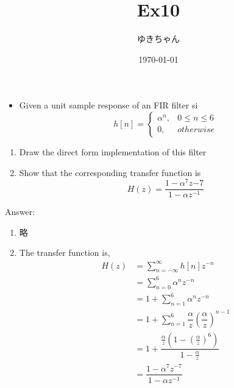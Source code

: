 \documentclass[a4paper,16pt]{jsarticle}
\title{Ex10}
\author{ゆきちゃん}
\date{\today}
\begin{document}
\maketitle

\begin{itemize}
	\item Given a unit sample response of an FIR filter si
	\begin{equation}
		h[n] =
		\begin{cases}
			\alpha^n, & 0 \leq n \leq 6 \\
			0,        & otherwise
		\end{cases}
	\end{equation}
\end{itemize}

\begin{enumerate}
	\item Draw the direct form implementation of this filter
	\item Show that the corresponding transfer function is
	\begin{equation}
		H(z) = \dfrac{1 - \alpha^7 z{-7}}{1 - \alpha z^{-1}}
	\end{equation}
\end{enumerate}

Answer:

\begin{enumerate}
	\item 略
	\item The transfer function is,
	\begin{align}
		H(z) &= \sum_{n=-\infty}^\infty h[n]z^{-n} \\
		&= \sum_{n=0}^{6} \alpha^n z^{-n} \\
		&= 1 + \sum_{n=1}^{6} \alpha^n z^{-n} \\
		&= 1 + \sum_{n=1}^{6} \dfrac{\alpha}{z}\left(\dfrac{\alpha}{z}\right)^{n-1} \\
		&= 1 + \dfrac{\frac{\alpha}{z}(1-(\frac{\alpha}{z})^6)}{1-\frac{\alpha}{z}} \\
		&= \dfrac{1-\alpha^7 z^{-7}}{1-\alpha z^{-1}}
	\end{align}
\end{enumerate}
\end{document}

